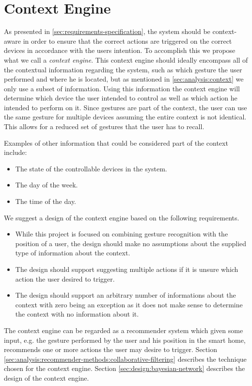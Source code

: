 \section{Context Engine}
\label{sec:analysis:context-engine}

As presented in \cref{sec:requirements-specification}, the system should be context-aware in order to ensure that the correct actions are triggered on the correct devices in accordance with the users intention.
To accomplish this we propose what we call a \emph{context engine}.
This context engine should ideally encompass all of the contextual information regarding the system, such as which gesture the user performed and where he is located, but as mentioned in \cref{sec:analysis:context} we only use a subset of information. 
Using this information the context engine will determine which device the user intended to control as well as which action he intended to perform on it.
Since gestures are part of the context, the user can use the same gesture for multiple devices assuming the entire context is not identical.
This allows for a reduced set of gestures that the user has to recall.

Examples of other information that could be considered part of the context include:

\begin{itemize}
\item The state of the controllable devices in the system.
\item The day of the week.
\item The time of the day.
\end{itemize}

We suggest a design of the context engine based on the following requirements.

\begin{itemize}
\item While this project is focused on combining gesture recognition with the position of a user, the design should make no assumptions about the supplied type of information about the context.
\item The design should support suggesting multiple actions if it is unsure which action the user desired to trigger.
\item The design should support an arbitrary number of informations about the context with zero being an exception as it does not make sense to determine the context with no information about it.
\end{itemize}

The context engine can be regarded as a recommender system which given some input, e.g. the gesture performed by the user and his position in the smart home, recommends one or more actions the user may desire to trigger. Section \ref{sec:analysis:recommender-methods:collaborative-filtering} describes the technique chosen for the context engine. Section \ref{sec:design:bayesian-network} describes the design of the context engine.

